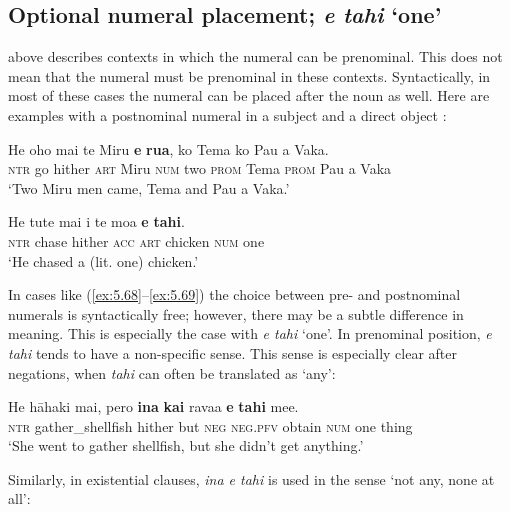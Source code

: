 \subsection{Optional numeral placement; \textit{e tahi} ‘one’}\label{sec:5.4.3}
 above describes contexts in which the numeral can be prenominal. This does not mean that the numeral must be prenominal in these contexts. Syntactically, in most of these cases the numeral can be placed after the noun as well. Here are examples with a postnominal numeral in a subject   and a direct object  :

\ea\label{ex:5.68}
\gll He oho mai te Miru \textbf{e} \textbf{rua}, ko Tema ko Pau {\ꞌ}a Vaka. \\
\textsc{ntr} go hither \textsc{art} Miru \textsc{num} two \textsc{prom} Tema \textsc{prom} Pau a Vaka \\

\glt 
‘Two Miru men came, Tema and Pau a Vaka.’ \textstyleExampleref{[Mtx-3-06.024]}
\z

\ea\label{ex:5.69}
\gll He tute mai i te moa \textbf{e} \textbf{tahi}. \\
\textsc{ntr} chase hither \textsc{acc} \textsc{art} chicken \textsc{num} one \\

\glt
‘He chased a (lit. one) chicken.’ \textstyleExampleref{[Mtx-7-03.033]}
\z

In cases like (\ref{ex:5.68}–\ref{ex:5.69}) the choice between pre- and postnominal numerals is syntactically free; however, there may be a subtle difference in meaning. This is especially the case with \textit{e tahi} ‘one’. In prenominal position, \textit{e tahi} tends to have a non-specific sense. This sense is especially clear after negations, when \textit{tahi} can often be translated as ‘any’:

\ea\label{ex:5.70}
\gll He hāhaki mai, pero \textbf{{\ꞌ}ina} \textbf{kai} rava{\ꞌ}a \textbf{e} \textbf{tahi} me{\ꞌ}e. \\
\textsc{ntr} gather\_shellfish hither but \textsc{neg} \textsc{neg.pfv} obtain \textsc{num} one thing \\

\glt
‘She went to gather shellfish, but she didn’t get anything.’ \textstyleExampleref{[R178.026]} 
\z

Similarly, in existential clauses, \textit{{\ꞌ}ina e tahi} is used in the sense ‘not any, none at all’:

